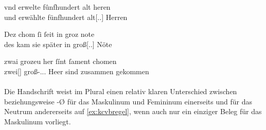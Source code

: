 \begin{exe}
\ex \label{ex:kcb1regel}
	\begin{xlist}
	\ex \label{ex:kcb1regel_1}
		\gll vnd erwelte fûnfhundert alt heren \\
			und erwählte fünfhundert alt[\Nom.\Pl.\MascM] Herren \\
		\begin{taggedline}{\parencites[\pno~23\vb, 23]{kc:B1}[vgl.][8477]{schroeder1895}}
		\trans {}
		\end{taggedline}

	\ex \label{ex:kcb1regel_2}
		\gll Dez chom ſi ſeit in groz note \\
			des kam sie später in groß[\Acc.\Pl.\FemI] Nöte \\
		\begin{taggedline}{\parencites[\pno~31\vb, 15]{kc:B1}[vgl.][11413]{schroeder1895}}
		\trans {}
		\end{taggedline}

	\ex \label{ex:kcb1regel_3}
		\gll zwai grozeu her ſínt ſament chomen \\
			zwei[\NeutI] groß-\Nom.\Pl.\NeutI.\St{} Heer sind zusammen
				gekommen \\
		\begin{taggedline}{\parencites[\pno~11\rc, 2]{kc:B1}[zu][3535]{schroeder1895}}
		\trans {}
		\end{taggedline}
	\end{xlist}
\end{exe}

\paragraph{\citet{kc:VB}}
\label{par:adjvb}
Die Handschrift \citet{kc:VB} weist im Plural einen relativ klaren Unterschied
zwischen  beziehungsweise -Ø für das Maskulinum und Femininum
einerseits und  für das Neutrum andererseits auf \cref{ex:kcvbregel},
wenn auch nur ein einziger Beleg für das Maskulinum vorliegt.

